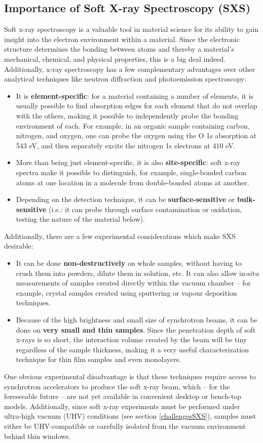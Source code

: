 \subsection{Importance of Soft X-ray Spectroscopy (SXS)}
Soft x-ray spectroscopy is a valuable tool in material science for its ability to gain insight into the electron environment within a material.  Since the electronic structure determines the bonding between atoms and thereby a material's mechanical, chemical, and physical properties, this is a big deal indeed.  Additionally, x-ray spectroscopy has a few complementary advantages over other analytical techniques like neutron diffraction and photoemission spectroscopy:
\begin{itemize}
\item It is \textbf{element-specific}: for a material containing a number of elements, it is usually possible to find absorption edges for each element that do not overlap with the others, making it possible to independently probe the bonding environment of each.  For example, in an organic sample containing carbon, nitrogen, and oxygen, one can  probe the oxygen using the O 1s absorption at 543 eV, and then separately excite the nitrogen 1s electrons at 410 eV.
\item More than being just element-specific, it is also \textbf{site-specific}: soft x-ray spectra make it possible to distinguish, for example, single-bonded carbon atoms at one location in a molecule from double-bonded atoms at another.
\item Depending on the detection technique, it can be \textbf{surface-sensitive} or \textbf{bulk-sensitive} (i.e.: it can probe through surface contamination or oxidation, testing the nature of the material below).
\end{itemize}

Additionally, there are a few experimental considerations which make SXS desirable:
\begin{itemize}
\item It can be done \textbf{non-destructively} on whole samples, without having to crush them into powders, dilute them in solution, etc.  It can also allow in-situ measurements of samples created directly within the vacuum chamber -- for example, crystal samples created using sputtering or vapour deposition techniques.
\item Because of the high brightness and small size of synchrotron beams, it can be done on \textbf{very small and thin samples}.  Since the penetration depth of soft x-rays is so short, the interaction volume created by the beam will be tiny regardless of the sample thickness, making it a very useful characterization technique for thin film samples and even monolayers.
\end{itemize}
One obvious experimental disadvantage is that these techniques require access to synchrotron accelerators to produce the soft x-ray beam, which -- for the foreseeable future -- are not yet available in convenient desktop or bench-top models.  Additionally, since soft x-ray experiments must be performed under ultra-high vacuum (UHV) conditions (see section \ref{challengesSXS}), samples must either be UHV-compatible or carefully isolated from the vacuum environment behind thin windows.

